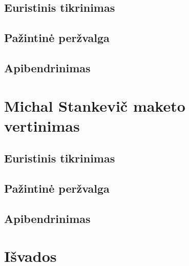 \documentclass{VUMIFPSkursinis}
\begin{document}
\subsection{Euristinis tikrinimas}
\subsection{Pažintinė peržvalga}
\subsection{Apibendrinimas}
\section{Michal Stankevič maketo vertinimas}
\subsection{Euristinis tikrinimas}
\subsection{Pažintinė peržvalga}
\subsection{Apibendrinimas}
\section{Išvados}
\end{document}
